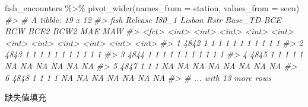 \documentclass[
]{book}
\newenvironment{Shaded}{\begin{snugshade}}{\end{snugshade}}
\newcommand{\AttributeTok}[1]{\textcolor[rgb]{0.77,0.63,0.00}{#1}}
\newcommand{\CommentTok}[1]{\textcolor[rgb]{0.56,0.35,0.01}{\textit{#1}}}
\newcommand{\FunctionTok}[1]{\textcolor[rgb]{0.00,0.00,0.00}{#1}}
\newcommand{\NormalTok}[1]{#1}
\newcommand{\SpecialCharTok}[1]{\textcolor[rgb]{0.00,0.00,0.00}{#1}}
\begin{document}
\begin{Shaded}
\begin{Highlighting}[]
\NormalTok{fish\_encounters }\SpecialCharTok{\%\textgreater{}\%} \FunctionTok{pivot\_wider}\NormalTok{(}\AttributeTok{names\_from =}\NormalTok{ station, }\AttributeTok{values\_from =}\NormalTok{ seen)}
\CommentTok{\#\textgreater{} \# A tibble: 19 x 12}
\CommentTok{\#\textgreater{}   fish  Release I80\_1 Lisbon  Rstr Base\_TD   BCE   BCW  BCE2  BCW2   MAE   MAW}
\CommentTok{\#\textgreater{}   \textless{}fct\textgreater{}   \textless{}int\textgreater{} \textless{}int\textgreater{}  \textless{}int\textgreater{} \textless{}int\textgreater{}   \textless{}int\textgreater{} \textless{}int\textgreater{} \textless{}int\textgreater{} \textless{}int\textgreater{} \textless{}int\textgreater{} \textless{}int\textgreater{} \textless{}int\textgreater{}}
\CommentTok{\#\textgreater{} 1 4842        1     1      1     1       1     1     1     1     1     1     1}
\CommentTok{\#\textgreater{} 2 4843        1     1      1     1       1     1     1     1     1     1     1}
\CommentTok{\#\textgreater{} 3 4844        1     1      1     1       1     1     1     1     1     1     1}
\CommentTok{\#\textgreater{} 4 4845        1     1      1     1       1    NA    NA    NA    NA    NA    NA}
\CommentTok{\#\textgreater{} 5 4847        1     1      1    NA      NA    NA    NA    NA    NA    NA    NA}
\CommentTok{\#\textgreater{} 6 4848        1     1      1     1      NA    NA    NA    NA    NA    NA    NA}
\CommentTok{\#\textgreater{} \# ... with 13 more rows}
\end{Highlighting}
\end{Shaded}

缺失值填充
\end{document}
